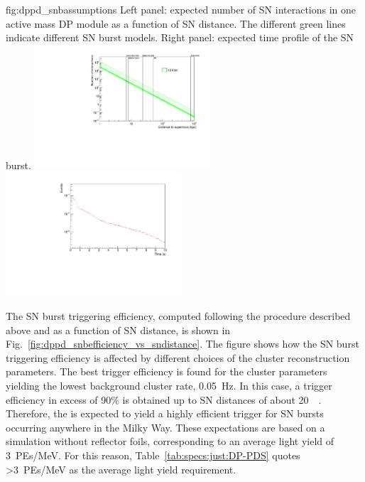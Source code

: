 \begin{dunefigure}{fig:dppd_snbassumptions}
     {Left panel: expected number of SN \nue {} interactions in one \dpactivelarmass active mass DP module as a function of SN distance. The different green lines indicate different SN burst models. Right panel: expected time profile of the SN burst.}
    \includegraphics[width=0.49\textwidth]{graphics/dppd_events_vs_sndistance.pdf} \hfill
    \includegraphics[width=0.49\textwidth]{graphics/dppd_sntime_profile.pdf} 
    \end{dunefigure}

The SN burst triggering efficiency, computed following the procedure described above and as a function of SN distance, is shown in Fig.~\ref{fig:dppd_snbefficiency_vs_sndistance}. The figure shows how the SN burst triggering efficiency is affected by different choices of the cluster reconstruction parameters. The best trigger efficiency is found for the cluster parameters yielding the lowest background cluster rate, \SI{0.05}{\Hz}. In this case, a trigger efficiency in excess of \num{90}\% is obtained up to SN distances of about \SI{20}{\kilo\parsec}. Therefore, the  is expected to yield a highly efficient trigger for SN bursts occurring anywhere in the Milky Way. These expectations are based on a  simulation without  reflector foils, corresponding to an average light yield of \SI{3}{PEs/\MeV}. For this reason, Table~\ref{tab:specs:just:DP-PDS} quotes \SI{>3}{PEs/\MeV} as the average light yield requirement.

